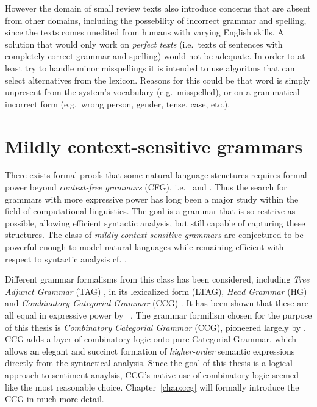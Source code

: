 However the domain of small review texts also introduce concerns that are absent from other domains, including the possebility of incorrect grammar and spelling, since the texts comes unedited from humans with varying English skills. A solution that would only work on \emph{perfect texts} (i.e.\ texts of sentences with completely correct grammar and spelling) would not be adequate. In order to at least try to handle minor misspellings it is intended to use algoritms that can select alternatives from the lexicon. Reasons for this could be that word is simply unpresent from the system's vocabulary (e.g.\ misspelled), or on a grammatical incorrect form (e.g.\ wrong person, gender, tense, case, etc.). 

\section{Mildly context-sensitive grammars}
There exists formal proofs that some natural language structures requires formal power beyond \emph{context-free grammars} (CFG), i.e.\ \cite{nlpNotCFG} and \cite{nlpNotCFG2}. Thus the search for grammars with more expressive power has long been a major study within the field of computational linguistics. The goal is a grammar that is so restrive as possible, allowing efficient syntactic analysis, but still capable of capturing these structures. The class of \emph{mildly context-sensitive grammars} are conjectured to be powerful enough to model natural languages while remaining efficient with respect to syntactic analysis cf. \cite{mildlyCSG}.

Different grammar formalisms from this class has been considered, including \emph{Tree Adjunct Grammar} (TAG) \cite{tag}, in its lexicalized form (LTAG), \emph{Head Grammar} (HG) \cite{hg} and \emph{Combinatory Categorial Grammar} (CCG) \cite{steedmanDraft}. It has been shown that these are all equal in expressive power by \citeauthor{theEquivalence}~. The grammar formilism chosen for the purpose of this thesis is \emph{Combinatory Categorial Grammar} (CCG), pioneered largely by \citeauthor{sp} . CCG adds a layer of combinatory logic onto pure Categorial Grammar, which allows an elegant and succinct formation of \emph{higher-order} semantic expressions directly from the syntactical analysis. Since the goal of this thesis is a logical approach to sentiment anaylsis, CCG's native use of combinatory logic seemed like the most reasonable choice. Chapter~\ref{chap:ccg} will formally introduce the CCG in much more detail.

